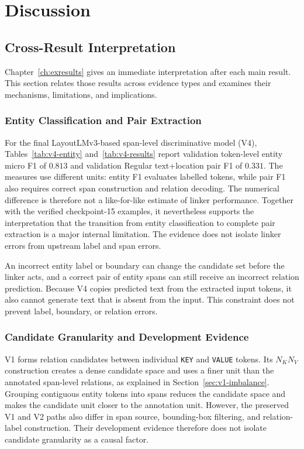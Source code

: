 \chapter{Discussion}
\label{ch:discussion}

\section{Cross-Result Interpretation}
\label{sec:interpretation}

Chapter~\ref{ch:exresults} gives an immediate interpretation after each main
result. This section relates those results across evidence types and examines
their mechanisms, limitations, and implications.

\subsection{Entity Classification and Pair Extraction}

For the final LayoutLMv3-based span-level discriminative model (V4),
Tables~\ref{tab:v4-entity} and~\ref{tab:v4-results} report validation
token-level entity micro F1 of $0.813$ and validation Regular text+location
pair F1 of $0.331$. The measures use different units: entity F1 evaluates
labelled tokens, while pair F1 also requires correct span construction and
relation decoding. The numerical difference is therefore not a like-for-like
estimate of linker performance. Together with the verified checkpoint-15
examples, it nevertheless supports the interpretation that the transition
from entity classification to complete pair extraction is a major internal
limitation. The evidence does not isolate linker errors from upstream label and
span errors.

An incorrect entity label or boundary can change the candidate set before the
linker acts, and a correct pair of entity spans can still receive an incorrect
relation prediction. Because V4 copies predicted text from the extracted input
tokens, it also cannot generate text that is absent from the input. This
constraint does not prevent label, boundary, or relation errors.

\subsection{Candidate Granularity and Development Evidence}

V1 forms relation candidates between individual \texttt{KEY} and
\texttt{VALUE} tokens. Its $N_KN_V$ construction creates a dense candidate
space and uses a finer unit than the annotated span-level relations, as
explained in Section~\ref{sec:v1-imbalance}. Grouping contiguous entity tokens
into spans reduces the candidate space and makes the candidate unit closer to
the annotation unit. However, the preserved V1 and V2 paths also differ in
span source, bounding-box filtering, and relation-label construction. Their
development evidence therefore does not isolate candidate granularity as a
causal factor.

